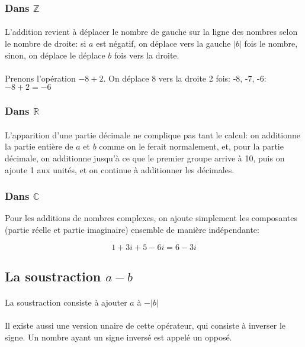 \documentclass[a4paper]{book}
\begin{document}
    \subsubsection{Dans $\mathds{Z}$}
    \paragraph{}
    L'addition revient à déplacer le nombre de gauche sur la ligne des nombres selon le nombre de droite: 
    si $a$ est négatif, on déplace vers la gauche $|b|$ fois le nombre, sinon, on déplace le déplace $b$ fois vers la droite.
    \paragraph{}
    Prenons l'opération $-8 + 2$. On déplace $8$ vers la droite 2 fois: -8, -7, -6: $-8 + 2 = -6$
    \subsubsection{Dans $\mathds{R}$}
    \paragraph{}
    L'apparition d'une partie décimale ne complique pas tant le calcul: on additionne la partie entière de $a$ et $b$ comme on le ferait normalement, et, pour la partie décimale, on additionne jusqu'à ce que le premier groupe arrive à 10, puis on ajoute 1 aux unités, et on continue à additionner les décimales.
    \subsubsection{Dans $\mathds{C}$}
    Pour les additions de nombres complexes, on ajoute simplement les composantes (partie réelle et partie imaginaire) ensemble de manière indépendante: 
    
    $$1+3i + 5-6i = 6-3i$$
    
    \subsection{La soustraction $a - b$}
    \paragraph{}
    La soustraction consiste à ajouter $a$ à $-|b|$
    \paragraph{}
    Il existe aussi une version unaire de cette opérateur, qui consiste à inverser le signe. Un nombre ayant un signe inversé est appelé un opposé.
    
\end{document}

